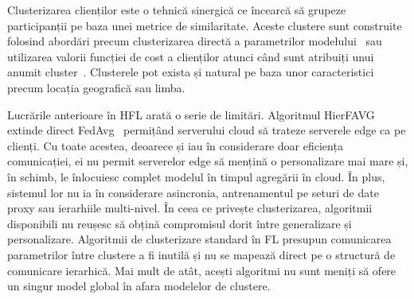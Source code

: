 Clusterizarea clienților este o tehnică sinergică ce încearcă să grupeze participanții pe baza unei metrice de similaritate. Aceste clustere sunt construite folosind abordări precum clusterizarea directă a parametrilor modelului~\citep{ClusterFL} sau utilizarea valorii funcției de cost a clienților atunci când sunt atribuiți unui anumit cluster~\citep{ThreeApproachesMansour}. Clusterele pot exista și natural pe baza unor caracteristici precum locația geografică sau limba.

Lucrările anterioare în HFL arată o serie de limitări. Algoritmul HierFAVG extinde direct FedAvg~\citep{FedAvg} permițând serverului cloud să trateze serverele edge ca pe clienți. Cu toate acestea, deoarece \citet{Client-Edge-CloudHierFL} și \citet{Hier_Het_Cellular} iau în considerare doar eficiența comunicației, ei nu permit serverelor edge să mențină o personalizare mai mare și, în schimb, le înlocuiesc complet modelul în timpul agregării în cloud. În plus, sistemul lor nu ia în considerare asincronia, antrenamentul pe seturi de date proxy sau ierarhiile multi-nivel. În ceea ce privește clusterizarea, algoritmii disponibili nu reușesc să obțină compromisul dorit între generalizare și personalizare. Algoritmii de clusterizare standard în FL presupun comunicarea parametrilor între clustere a fi inutilă și nu se mapează direct pe o structură de comunicare ierarhică. Mai mult de atât, acești algoritmi nu sunt meniți să ofere un singur model global în afara modelelor de clustere.

